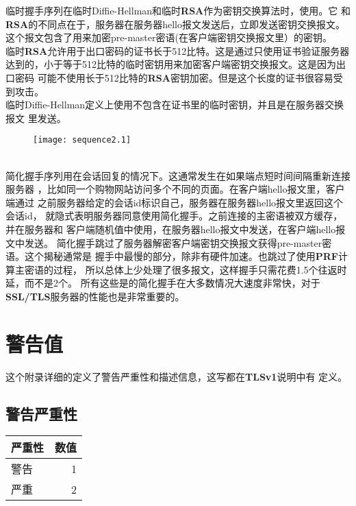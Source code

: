 \documentclass[11pt,dvips]{article}
\newcommand{\bfs}[1]{{\bf{#1}}}
\begin{document}
临时握手序列在临时Diffie-Hellman和临时\bfs{RSA}作为密钥交换算法时，使用。它
和\bfs{RSA}的不同点在于，服务器在服务器hello报文发送后，立即发送密钥交换报文。
这个报文包含了用来加密pre-master密语(在客户端密钥交换报文里）的密钥。\\


临时\bfs{RSA}允许用于出口密码的证书长于512比特。这是通过只使用证书验证服务器
达到的，小于等于512比特的临时密钥用来加密客户端密钥交换报文。这是因为出口密码
可能不使用长于512比特的\bfs{RSA}密钥加密。但是这个长度的证书很容易受到攻击。\\

临时Diffie-Hellman定义上使用不包含在证书里的临时密钥，并且是在服务器交换报文
里发送。\\
\begin{figure}

\texttt{[image: sequence2.1]}
\end{figure}
\\

简化握手序列用在会话回复的情况下。这通常发生在如果端点短时间间隔重新连接服务器
，比如同一个购物网站访问多个不同的页面。在客户端hello报文里，客户端通过
之前服务器给定的会话id标识自己，服务器在服务器hello报文里返回这个会话id，
就隐式表明服务器同意使用简化握手。之前连接的主密语被双方缓存，并在服务器和
客户端随机值中使用，在服务器hello报文中发送，在客户端hello报文中发送。
简化握手跳过了服务器解密客户端密钥交换报文获得pre-master密语。这个揭秘通常是
握手中最慢的部分，除非有硬件加速。也跳过了使用\bfs{PRF}计算主密语的过程，
所以总体上少处理了很多报文，这样握手只需花费1.5个往返时延，而不是2个。
所有这些是的简化握手在大多数情况大速度非常快，对于\bfs{SSL/TLS}服务器的性能也是非常重要的。





\pagebreak
\appendix
\section{警告值}

这个附录详细的定义了警告严重性和描述信息，这写都在\bfs{TLSv1}说明中有
定义。\\

\subsection{警告严重性}
\begin{center}
\begin{tabular}{|l|r|}
        \hline
        严重性&数值\\
        \hline
           警告&1\\
           严重&2\\
        \hline
\end{tabular}
\end{center}
\end{document}
